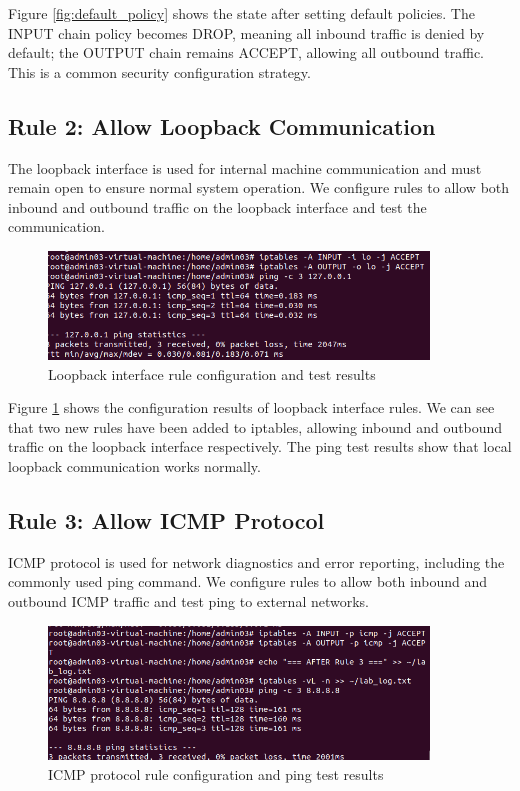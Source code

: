 \documentclass[12pt,a4paper]{article}
\begin{document}
Figure \ref{fig:default_policy} shows the state after setting default policies. The INPUT chain policy becomes DROP, meaning all inbound traffic is denied by default; the OUTPUT chain remains ACCEPT, allowing all outbound traffic. This is a common security configuration strategy.

\subsection{Rule 2: Allow Loopback Communication}

The loopback interface is used for internal machine communication and must remain open to ensure normal system operation. We configure rules to allow both inbound and outbound traffic on the loopback interface and test the communication.

\begin{figure}[H]
    \centering
    \includegraphics[width=0.9\textwidth]{04_loopback_rule.png}
    \caption{Loopback interface rule configuration and test results}
    \label{fig:loopback_rule}
\end{figure}

Figure \ref{fig:loopback_rule} shows the configuration results of loopback interface rules. We can see that two new rules have been added to iptables, allowing inbound and outbound traffic on the loopback interface respectively. The ping test results show that local loopback communication works normally.

\subsection{Rule 3: Allow ICMP Protocol}

ICMP protocol is used for network diagnostics and error reporting, including the commonly used ping command. We configure rules to allow both inbound and outbound ICMP traffic and test ping to external networks.

\begin{figure}[H]
    \centering
    \includegraphics[width=0.9\textwidth]{05_icmp_rul.png}
    \caption{ICMP protocol rule configuration and ping test results}
    \label{fig:icmp_rule}
\end{figure}
\end{document}
